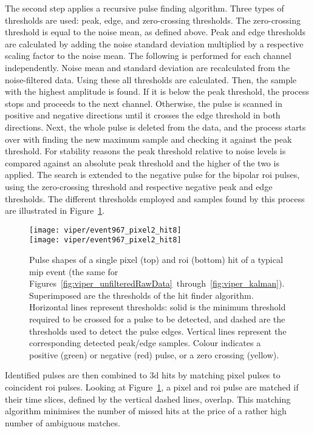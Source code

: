The second step applies a recursive pulse finding algorithm.
Three types of thresholds are used: peak, edge, and zero-crossing thresholds.
The zero-crossing threshold is equal to the noise mean, as defined above.
Peak and edge thresholds are calculated by adding the noise standard deviation multiplied by a respective scaling factor to the noise mean.
The following is performed for each channel independently.
Noise mean and standard deviation are recalculated from the noise-filtered data.
Using these all thresholds are calculated.
Then, the sample with the highest amplitude is found.
If it is below the peak threshold, the process stops and proceeds to the next channel.
Otherwise, the pulse is scanned in positive and negative directions until it crosses the edge threshold in both directions.
Next, the whole pulse is deleted from the data, and the process starts over with finding the new maximum sample and checking it against the peak threshold.
For stability reasons the peak threshold relative to noise levels is compared against an absolute peak threshold and the higher of the two is applied.
The search is extended to the negative pulse for the bipolar \gls{roi} pulses, using the zero-crossing threshold and respective negative peak and edge thresholds.
The different thresholds employed and samples found by this process are illustrated in Figure~\ref{fig:viper_hitFinder}.

\begin{figure}[htb]
	\centering
	\texttt{[image: viper/event967\_pixel2\_hit8]}\\
	\texttt{[image: viper/event967\_pixel2\_hit8]}
	\caption[Pulse shapes of typical pixel demonstrator event]{%
		Pulse shapes of a single pixel (top) and \acrshort{roi} (bottom) hit of a typical \acrshort{mip} event (the same for Figures~\ref{fig:viper_unfilteredRawData}~through~\ref{fig:viper_kalman}).
		Superimposed are the thresholds of the hit finder algorithm. Horizontal lines represent thresholds: solid is the minimum threshold required to be crossed for a pulse to be detected, and dashed are the thresholds used to detect the pulse edges.
		Vertical lines represent the corresponding detected peak/edge samples.
		Colour indicates a positive (green) or negative (red) pulse, or a zero crossing (yellow).
	}
	\label{fig:viper_hitFinder}
\end{figure}

Identified pulses are then combined to \gls{3d} hits by matching pixel pulses to coincident \gls{roi} pulses.
Looking at Figure~\ref{fig:viper_hitFinder}, a pixel and \gls{roi} pulse are matched if their time slices, defined by the vertical dashed lines, overlap.
This matching algorithm minimises the number of missed hits at the price of a rather high number of ambiguous matches.

